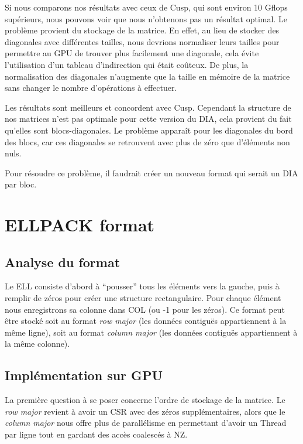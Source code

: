 \documentclass[a4paper,11pt]{report}
\begin{document}
    Si nous comparons nos résultats avec ceux de Cusp, qui sont
    environ 10 Gflops supérieurs, nous pouvons voir que nous
    n'obtenons pas un résultat optimal. Le problème provient du stockage
    de la matrice. En effet, au lieu de stocker des diagonales avec différentes
    tailles, nous devrions normaliser leurs tailles pour permettre au
    GPU de trouver plus facilement une diagonale, cela évite l'utilisation
    d'un tableau d'indirection qui était coûteux. De plus, la normalisation des
    diagonales n'augmente que la taille en mémoire de la matrice sans changer
    le nombre d'opérations à effectuer.
   
    
    Les résultats sont meilleurs et concordent avec Cusp. Cependant la
    structure de nos matrices n'est pas optimale pour cette version
    du DIA, cela provient du fait qu'elles sont blocs-diagonales. Le
    problème apparaît pour les diagonales du bord des blocs, car ces
    diagonales se retrouvent avec plus de zéro que d'éléments non
    nuls.

    
    Pour résoudre ce problème, il faudrait créer un nouveau format qui
    serait un DIA par bloc.

 \section[ELL : ELLPACK format]{ELLPACK format}
  \subsection{Analyse du format}
   
   Le ELL consiste d'abord à ``pousser'' tous les éléments vers la gauche,
   puis à remplir de zéros pour créer une structure rectangulaire. Pour
   chaque élément nous enregistrons sa colonne dans COL (ou -1 pour les
   zéros). Ce format peut être stocké soit au format \textit{row major} (les données contiguës
   appartiennent à la même ligne), soit au format \textit{column major} (les données contiguës
   appartiennent à la même colonne).

  \subsection{Implémentation sur GPU}
   La première question à se poser concerne l'ordre de stockage de la
   matrice. Le \textit{row major} revient à avoir un CSR avec des zéros
   supplémentaires, alors que le \textit{column major} nous offre plus de
   parallélisme en permettant d'avoir un Thread
   par ligne tout en gardant des accès coalescés à NZ.
   
\end{document}
